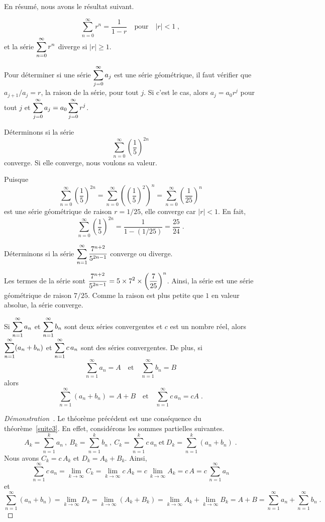 {En résumé, nous avons le résultat suivant.

\begin{prop}
\[
\sum_{n=0}^\infty r^n = \frac{1}{1-r} \quad \text{pour} \quad  |r|<1 \; ,
\]
et la série $\displaystyle \sum_{n=0}^\infty r^n$ diverge si
$|r|\geq 1$.
\end{prop}

Pour déterminer si une série $\displaystyle \sum_{j=0}^\infty a_j$ est
une série géométrique, il faut vérifier que $a_{j+1}/a_j = r$, la
raison de la série, pour tout $j$.  Si c'est le cas, alors
$a_j = a_0 r^j$ pour tout $j$ et
$\displaystyle \sum_{j=0}^\infty a_j = a_0\sum_{j=0}^\infty r^j$.

\begin{egg}
Déterminons si la série
\[
\sum_{n=0}^\infty \left(\frac{1}{5}\right)^{2n}
\]
converge.  Si elle converge, nous voulons sa valeur.

Puisque
\[
\sum_{n=0}^\infty \left(\frac{1}{5}\right)^{2n}
= \sum_{n=0}^\infty \left( \left(\frac{1}{5}\right)^2 \right)^n
= \sum_{n=0}^\infty \left(\frac{1}{25}\right)^n
\]
est une série géométrique de raison $r = 1/25$, elle converge car
$|r|<1$.  En fait,
\[
\sum_{n=0}^\infty \left(\frac{1}{5}\right)^{2n} = \frac{1}{1-(1/25)}
= \frac{25}{24} \; .
\]
\end{egg}

\begin{egg}
Déterminons si la série
  $\displaystyle \sum_{n=1}^\infty \frac{7^{n+2}}{5^{2n-1}}$
converge ou diverge.

Les termes de la série sont
$\displaystyle \frac{7^{n+2}}{5^{2n-1}} = 5\times 7^2 \times
\left(\frac{7}{25}\right)^n$.  Ainsi, la série est une série
géométrique de raison $7/25$.  Comme la raison est plus petite que $1$
en valeur absolue, la série converge.
\end{egg}

\begin{theorem}
Si $\displaystyle \sum_{n=1}^\infty a_n$ et
$\displaystyle \sum_{n=1}^\infty b_n$ sont deux séries convergentes et
$c$ est un nombre réel, alors
$\displaystyle \sum_{n=1}^\infty (a_n+b_n)$ et
$\displaystyle \sum_{n=1}^\infty c\, a_n$ sont des séries convergentes.
De plus, si
\[
\sum_{n=1}^\infty a_n = A \quad \text{et} \quad \sum_{n=1}^\infty b_n = B
\]
alors
\[
\sum_{n=1}^\infty (a_n+b_n) = A+B \quad \text{et}
\quad \sum_{n=1}^\infty c\, a_n = cA \; .
\]
\label{series_linear}
\end{theorem}

\begin{proof}[Démonstration\ \theory]
Le théorème précédent est une conséquence du théorème~\ref{suite3}.
En effet, considérons les sommes partielles suivantes.
\[
A_k = \sum_{n=1}^k a_n \ , \ 
B_k = \sum_{n=1}^k b_n \ , \ C_k = \sum_{n=1}^k c\,a_n
\ \text{et} \ D_k = \sum_{n=1}^k (a_n+b_n) \; .
\]
Nous avons $C_k = c\,A_k$ et $D_k = A_k + B_k$.  Ainsi,
\[
\sum_{n=1}^\infty c\,a_n = \lim_{k\rightarrow \infty} C_k
= \lim_{k\rightarrow \infty} c\,A_k
= c\,\lim_{k\rightarrow \infty} A_k = c\, A
= c\, \sum_{n=1}^\infty a_n
\]
et
\[
\sum_{n=1}^\infty (a_n+b_n) = \lim_{k\rightarrow \infty} D_k
= \lim_{k\rightarrow \infty} (A_k + B_k)
= \lim_{k\rightarrow \infty} A_k + \lim_{k\rightarrow \infty} B_k
= A + B
= \sum_{n=1}^\infty a_n + \sum_{n=1}^\infty b_n
\; .
\]
\end{proof}

}
